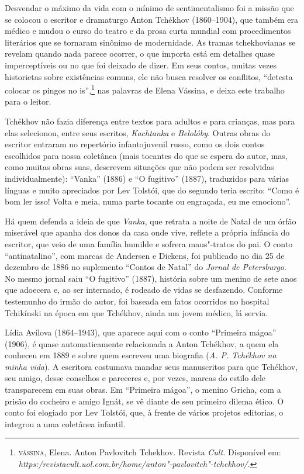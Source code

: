 Desvendar o máximo da vida com o mínimo de sentimentalismo foi a missão
que se colocou o escritor e dramaturgo Аnton Tchékhov (1860--1904), que
também era médico e mudou o curso do teatro e da prosa curta mundial com
procedimentos literários que se tornaram sinônimo de modernidade. As
tramas tchekhovianas se revelam quando nada parece ocorrer, o que
importa está em detalhes quase imperceptíveis ou no que foi deixado de
dizer. Em seus contos, muitas vezes historietas sobre existências
comuns, ele não busca resolver os conflitos, ``detesta colocar os pingos
no is'',\footnote{\textsc{vássina}, Elena. Anton Pavlovitch Tchekhov. Revista
  \emph{Cult.} Disponível em:
  \emph{https:/revistacult.uol.com.br/home/anton"-pavlovitch"-tchekhov/}.}
nas palavras de Elena Vássina, e deixa este trabalho para o leitor.

Tchékhov não fazia diferença entre textos para adultos e para crianças,
mas para elas selecionou, entre seus escritos, \emph{Kachtanka} e
\emph{Belolóby}. Outras obras do escritor entraram no repertório
infantojuvenil russo, como os dois contos escolhidos para nossa
coletânea (mais tocantes do que se espera do autor, mas, como muitas
obras suas, descrevem situações que não podem ser resolvidas
individualmente): ``Vanka'' (1886) e ``O fugitivo''
(1887), traduzidos para várias línguas e muito apreciados por Lev
Tolstói, que do segundo teria escrito: ``Como é bom ler isso! Volta e
meia, numa parte tocante ou engraçada, eu me emociono''.

Há quem defenda a ideia de que \emph{Vanka,} que retrata a noite de Natal
de um órfão miserável que apanha dos donos da casa onde vive, reflete a
própria infância do escritor, que veio de uma família humilde e sofrera
maus"-tratos do pai. O conto ``antinatalino'', com marcas de Andersen e
Dickens, foi publicado no dia 25 de dezembro de 1886 no suplemento
``Contos de Natal'' do \emph{Jornal de Petersburgo}. No mesmo jornal
saiu ``O fugitivo'' (1887), história sobre um menino de sete
anos que adoecera e, ao ser internado, é rodeado de vidas se desfazendo.
Conforme testemunho do irmão do autor, foi baseada em fatos ocorridos no
hospital Tchikínski na época em que Tchékhov, ainda um jovem médico, lá
servia.

Lídia Avílova (1864--1943), que aparece aqui com o conto ``Primeira
mágoa'' (1906), é quase automaticamente relacionada a Anton Tchékhov, a
quem ela conheceu em 1889 e sobre quem escreveu uma biografia (\emph{A.
P. Tchékhov na minha vida}). A escritora costumava mandar seus
manuscritos para que Tchékhov, seu amigo, desse conselhos e pareceres e,
por vezes, marcas do estilo dele transparecem em suas obras. Em
``Primeira mágoa'', o menino Gricha, com a prisão do
cocheiro e amigo Ignát, se vê diante de seu primeiro dilema ético. O conto foi
elogiado por Lev Tolstói, que, à frente de vários projetos editorias, o
integrou a uma coletânea infantil.

